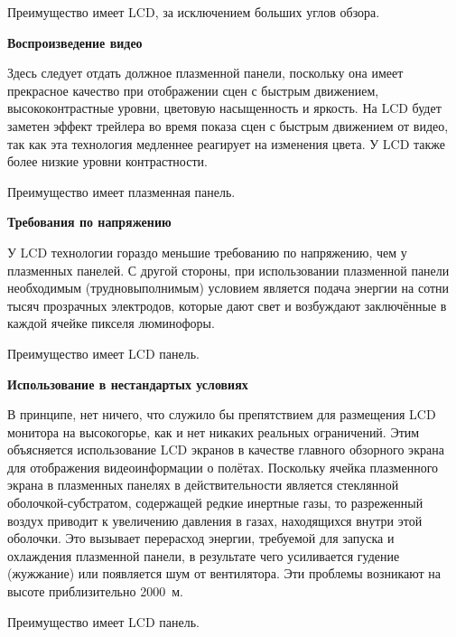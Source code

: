 Преимущество имеет LCD, за исключением больших углов обзора.

\begin{flushleft}
\textbf{Воспроизведение видео}
\end{flushleft}

Здесь следует отдать должное плазменной панели, поскольку она имеет прекрасное качество при отображении сцен с быстрым движением, высококонтрастные уровни, цветовую насыщенность и яркость. На LCD будет заметен эффект трейлера во время показа сцен с быстрым движением от видео, так как эта технология медленнее реагирует на изменения цвета. У LCD также более низкие уровни контрастности.

Преимущество имеет плазменная панель.

\begin{flushleft}
\textbf{Требования по напряжению}
\end{flushleft}

У LCD технологии гораздо меньшие требованию по напряжению, чем у плазменных панелей. С другой стороны, при использовании плазменной панели необходимым (трудновыполнимым) условием является подача энергии на сотни тысяч прозрачных электродов, которые дают свет и возбуждают заключённые в каждой ячейке пикселя люминофоры. 

Преимущество имеет LCD панель.

\begin{flushleft}
\textbf{Использование в нестандартых условиях}
\end{flushleft}

В принципе, нет ничего, что служило бы препятствием для размещения LCD монитора на высокогорье, как и нет никаких реальных ограничений. Этим объясняется использование LCD экранов в качестве главного обзорного экрана для отображения видеоинформации о полётах. Поскольку ячейка плазменного экрана в плазменных панелях в действительности является стеклянной оболочкой-субстратом, содержащей редкие инертные газы, то разреженный воздух приводит к увеличению давления в газах, находящихся внутри этой оболочки. Это вызывает перерасход энергии, требуемой для запуска и охлаждения плазменной панели, в результате чего усиливается гудение (жужжание) или появляется шум от вентилятора. Эти проблемы возникают на высоте приблизительно 2000~м. 

Преимущество имеет LCD панель.
